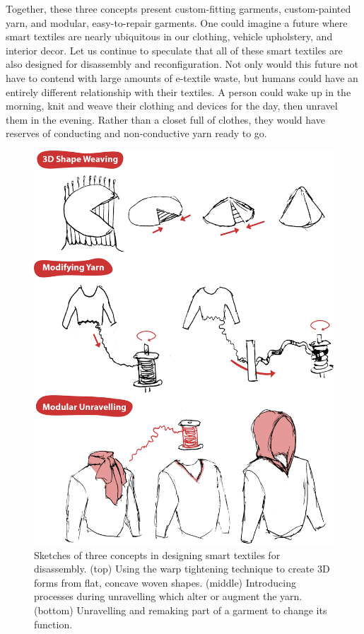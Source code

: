 Together, these three concepts present custom-fitting garments, custom-painted yarn, and modular, easy-to-repair garments. One could imagine a future where smart textiles are nearly ubiquitous in our clothing, vehicle upholstery, and interior decor. Let us continue to speculate that all of these smart textiles are also designed for disassembly and reconfiguration. Not only would this future not have to contend with large amounts of e-textile waste, but humans could have an entirely different relationship with their textiles. A person could wake up in the morning, knit and weave their clothing and devices for the day, then unravel them in the evening. Rather than a closet full of clothes, they would have reserves of conducting and non-conductive yarn ready to go.

\begin{figure}
    \centering
    \includegraphics[width=0.9\linewidth]{figs/UF_concepts.png}
    \caption[Three concept sketches in designing smart textiles for disassembly.]{Sketches of three concepts in designing smart textiles for disassembly. (top) Using the warp tightening technique to create 3D forms from flat, concave woven shapes. (middle) Introducing processes during unravelling which alter or augment the yarn. (bottom) Unravelling and remaking part of a garment to change its function.}
    \label{fig:concepts}
\end{figure}

